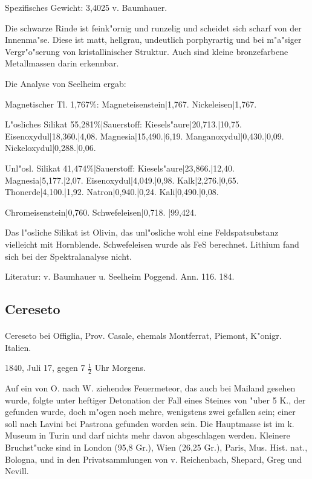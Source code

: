 \documentclass[a4paper, 11pt, oneside]{article}
\begin{document}
Spezifisches Gewicht: 3,4025 v. Baumhauer.

Die schwarze Rinde ist feink"ornig und runzelig und scheidet sich scharf von der Innenma"se. Diese ist matt, hellgrau, undeutlich porphyrartig und bei m"a"siger Vergr"o"serung von kristallinischer Struktur. Auch sind kleine bronzefarbene Metallmassen darin erkennbar.

Die Analyse von Seelheim ergab:

Magnetischer Tl. 1,767\%:  
Magneteisenstein|1,767.  
Nickeleisen|1,767.

L"osliches Silikat 55,281\%|Sauerstoff:  
Kiesels"aure|20,713.|10,75.  
Eisenoxydul|18,360.|4,08.  
Magnesia|15,490.|6,19.  
Manganoxydul|0,430.|0,09.  
Nickeloxydul|0,288.|0,06.  

Unl"osl. Silikat 41,474\%|Sauerstoff:  
Kiesels"aure|23,866.|12,40.  
Magnesia|5,177.|2,07.  
Eisenoxydul|4,049.|0,98.  
Kalk|2,276.|0,65.  
Thonerde|4,100.|1,92.  
Natron|0,940.|0,24.  
Kali|0,490.|0,08.

Chromeisenstein|0,760.  
Schwefeleisen|0,718.  
|99,424.

Das l"osliche Silikat ist Olivin, das unl"osliche wohl eine Feldspatsubstanz vielleicht mit Hornblende. Schwefeleisen wurde als FeS berechnet. Lithium fand sich bei der Spektralanalyse nicht.

\footnotesize
Literatur: v. Baumhauer u. Seelheim Poggend. Ann. 116. 184.

\subsection{Cereseto}
\normalsize
\paragraph{}
Cereseto bei Offiglia, Prov. Casale, ehemals Montferrat, Piemont, K"onigr. Italien.

1840, Juli 17, gegen 7 $\frac{1}{2}$ Uhr Morgens.

Auf ein von O. nach W. ziehendes Feuermeteor, das auch bei Mailand gesehen wurde, folgte unter heftiger Detonation der Fall eines Steines von "uber 5 K., der gefunden wurde, doch m"ogen noch mehre, wenigstens zwei gefallen sein; einer soll nach Lavini bei Pastrona gefunden worden sein. Die Hauptmasse ist im k. Museum in Turin und darf nichts mehr davon abgeschlagen werden. Kleinere Bruchst"ucke sind in London (95,8 Gr.), Wien (26,25 Gr.), Paris, Mus. Hist. nat., Bologna, und in den Privatsammlungen von v. Reichenbach, Shepard, Greg und Nevill.
\end{document}
